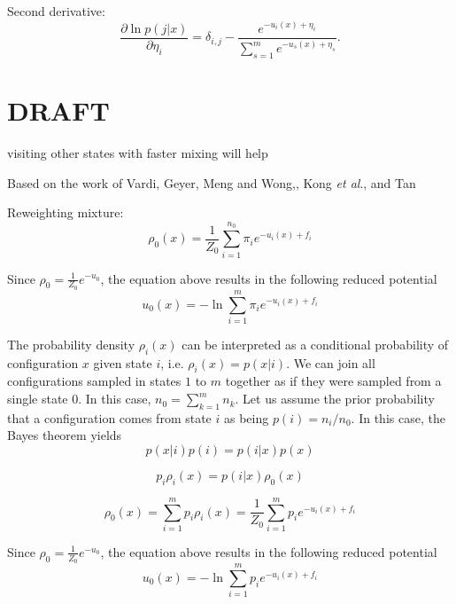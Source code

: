 \documentclass[aip,jcp,reprint,amsmath,amssymb]{revtex4-1}
\newcommand{\diff}[2]{\frac{\partial #1}{\partial #2}}  %
\begin{document}
Second derivative:
\begin{equation*}
\diff{\ln p(j|x)}{\eta_i} = \delta_{i,j} - \frac{e^{-u_i(x) + \eta_i}}{\sum_{s=1}^m e^{-u_s(x) + \eta_s}}.
\end{equation*}


\section{DRAFT}

visiting other states with faster mixing will help 

Based on the work of Vardi,\cite{Vardi_1985} Geyer,\cite{Geyer_1994} Meng and Wong,\cite{Meng_1996}, Kong \textit{et al}.\cite{Kong_2003}, and Tan\cite{Tan_2004}

Reweighting mixture\cite{Geyer_1994}:
\begin{equation*}
\rho_0(x) = \frac{1}{Z_0} \sum_{i=1}^{n_0} \pi_i e^{-u_i(x) + f_i}
\end{equation*}

Since $\rho_0 = \frac{1}{Z_0} e^{-u_0}$, the equation above results in the following reduced potential
\begin{equation}
\label{eq:mbar_reduced_potential}
u_0(x) = -\ln \sum_{i=1}^m \pi_i e^{-u_i(x) + f_i}
\end{equation}





The probability density $\rho_i(x)$ can be interpreted as a conditional probability of configuration $x$ given state $i$, i.e. $\rho_i(x) = p(x|i)$. We can join all configurations sampled in states $1$ to $m$ together as if they were sampled from a single state $0$. In this case, $n_0 = \sum_{k=1}^m n_k$. Let us assume the prior probability that a configuration comes from state $i$ as being $p(i) = n_i/n_0$. In this case, the Bayes theorem yields
\begin{equation*}
p(x|i) p(i) = p(i|x) p(x)
\end{equation*}

\begin{equation*}
p_i \rho_i(x) = p(i|x) \rho_0(x)
\end{equation*}

\begin{equation}
\label{eq:mbar_probability_density}
\rho_0(x) = \sum_{i=1}^m p_i \rho_i(x) = \frac{1}{Z_0} \sum_{i=1}^m p_i e^{-u_i(x) + f_i}
\end{equation}

Since $\rho_0 = \frac{1}{Z_0} e^{-u_0}$, the equation above results in the following reduced potential
\begin{equation}
\label{eq:mbar_reduced_potential}
u_0(x) = -\ln \sum_{i=1}^m p_i e^{-u_i(x) + f_i}
\end{equation}
\end{document}
